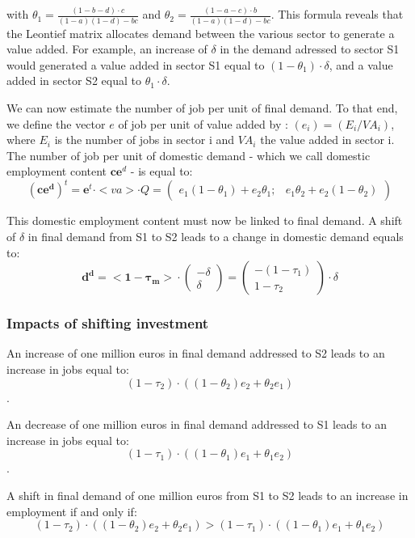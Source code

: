 with $\theta_1 =  \frac{(1-b-d) \cdot c}{(1-a)(1-d)-bc}$ and $\theta_2 = \frac{(1-a-c) \cdot b}{(1-a)(1-d)-bc}$. 
This formula reveals that the Leontief matrix allocates demand between the various sector to generate a value added. For example, an increase of $\delta$ in the demand adressed to sector S1 would generated a value added in sector S1 equal to $(1-\theta_1) \cdot \delta$, and a value added in sector S2 equal to $\theta_1 \cdot \delta$.

We can now estimate the number of job per unit of final demand. To that end, we define the vector $e$ of job per unit of value added by :
$(e_i) = (E_i/VA_i)$, where $E_i$ is the number of jobs in sector i and $VA_i$ the value added in sector i.
The number of job per unit of domestic demand - which we call domestic employment content $\pmb{ce}^d$ - is equal to:
$$(\pmb{ce^d})^t =
\pmb{e}^t \cdot <va> \cdot Q 
= 
\begin{pmatrix} 
e_1 (1-\theta_1) + e_2 \theta_1 ;&
e_1 \theta_2  + e_2 (1-\theta_2)
\end{pmatrix}
$$

This domestic employment content must now be linked to final demand. 
A shift of $\delta$ in final demand from S1 to S2 leads to a change in domestic demand equals to:
$$\pmb{d^d} =
\pmb{<1-\tau_m>} \cdot 
\begin{pmatrix} 
-\delta  \\
\delta
\end{pmatrix} 
=
\begin{pmatrix} 
- (1 - \tau_1) \\
1 - \tau_2
\end{pmatrix} \cdot \delta
$$

\subsubsection{Impacts of shifting investment}
An increase of one million euros in final demand addressed to S2 leads to an increase in jobs equal to:
$$(1-\tau_2) \cdot \left( (1-\theta_2) e_2+ \theta_2 e_1 \right)$$.

An decrease of one million euros in final demand addressed to S1 leads to an increase in jobs equal to:
$$(1-\tau_1) \cdot \left( (1-\theta_1) e_1+ \theta_1 e_2 \right)$$.

A shift in final demand of one million euros from S1 to S2 leads to an increase in employment if and only if:
$$(1-\tau_2) \cdot \left( (1-\theta_2) e_2+ \theta_2 e_1 \right) > (1-\tau_1) \cdot \left( (1-\theta_1) e_1+ \theta_1 e_2 \right)$$

